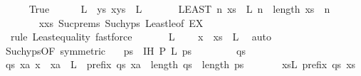 \begin{isabellebody}
\ \ \ \ \isamarkupfalse%
\ True\isanewline
\ \ \ \ \isamarkupfalse%
\ {\isacharquery}L\ {\isacharequal}\ {\isachardoublequoteopen}{\isacharbraceleft}ys{\isachardot}\ x{\isacharhash}ys\ {\isasymin}\ L{\isacharbraceright}{\isachardoublequoteclose}\isanewline
\ \ \ \ \isamarkupfalse%
\ {}{\isacharcolon}\ {\isachardoublequoteopen}{\isacharparenleft}LEAST\ n{\isachardot}\ {\isasymexists}xs\ {\isasymin}\ {\isacharquery}L{\isachardot}\ n\ {\isacharequal}\ length\ xs{\isacharparenright}\ {\isacharequal}\ n{\isachardoublequoteclose}\isanewline
\ \ \ \ \ \ \isamarkupfalse%
\ xxs\ Suc{\isachardot}prems\ Suc{\isachardot}hyps{\isacharparenleft}{}{\isacharparenright}\ Least{\isacharunderscore}le{\isacharbrackleft}of\ {\isachardoublequoteopen}{\isacharquery}EX{\isachardoublequoteclose}{\isacharbrackright}\isanewline
\ \ \ \ \ \ \isamarkupfalse%
\ {\isacharminus}\ {\isacharparenleft}rule\ Least{\isacharunderscore}equality{\isacharcomma}\ fastforce{\isacharplus}{\isacharparenright}\isanewline
\ \ \ \ \isamarkupfalse%
\ {}{\isacharcolon}\ {\isachardoublequoteopen}{\isacharquery}L\ {\isasymnoteq}\ {\isacharbraceleft}{\isacharbraceright}{\isachardoublequoteclose}\ \isamarkupfalse%
\ {\isacartoucheopen}x\ {\isacharhash}\ xs\ {\isasymin}\ L{\isacartoucheclose}\ \isamarkupfalse%
\ auto\isanewline
\ \ \ \ \isamarkupfalse%
\ Suc{\isachardot}hyps{\isacharparenleft}{}{\isacharparenright}{\isacharbrackleft}OF\ {}{\isacharbrackleft}symmetric{\isacharbrackright}\ {}{\isacharbrackright}\ \isamarkupfalse%
\ ps\ \ IH{\isacharcolon}\ {\isachardoublequoteopen}{\isacharquery}P\ {\isacharquery}L\ ps{\isachardoublequoteclose}\ \isacommand{{\isachardot}{\isachardot}}\isamarkupfalse%
\isanewline
\ \ \ \ \isacommand{{\isacharbraceleft}}\isamarkupfalse%
\ \isamarkupfalse%
\ qs\isanewline
\ \ \ \ \ \ \isamarkupfalse%
\ {\isachardoublequoteopen}{\isasymforall}qs{\isachardot}\ {\isacharparenleft}{\isasymforall}xa{\isachardot}\ x\ {\isacharhash}\ xa\ {\isasymin}\ L\ {\isasymlongrightarrow}\ prefix\ qs\ xa{\isacharparenright}\ {\isasymlongrightarrow}\ length\ qs\ {\isasymle}\ length\ ps{\isachardoublequoteclose}\isanewline
\ \ \ \ \ \ \ {\isachardoublequoteopen}{\isasymforall}xs{\isasymin}L{\isachardot}\ prefix\ qs\ xs{\isachardoublequoteclose}\isanewline
\ \ \ \ \ \ \isamarkupfalse%

\end{isabellebody}
